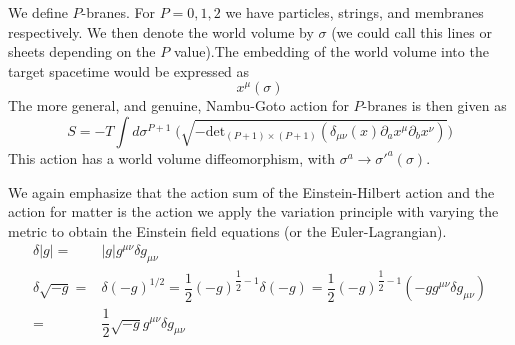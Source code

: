 \vspace{2ex}
\begin{defi}
We define $P$-branes. For $P=0,1,2$ we have particles, strings, and membranes respectively. We then denote the world volume by $\sigma $ (we could call this lines or sheets depending on the $P$ value).The embedding of the world volume into the target spacetime would be expressed as
\[x^{\mu }(\sigma )\]
The more general, and genuine, Nambu-Goto action for $P$-branes is then given as
\[S=-T\int d\sigma ^{P+1}\;\Big(\sqrt{-\mathrm{det}_{(P+1)\times (P+1)}(\delta _{\mu \nu }(x)\partial _{a}x^{\mu }\partial _{b}x^{\nu })}\Big)\]
This action has a world volume diffeomorphism, with $\sigma ^{a}\rightarrow \sigma '^{a}(\sigma )$.
\end{defi}
\vspace{2ex}
\begin{rmk}
We again emphasize that the action sum of the Einstein-Hilbert action and the action for matter is the action we apply the variation principle with varying the metric to obtain the Einstein field equations (or the Euler-Lagrangian). 
\begin{align*}
	\delta |g|=&|g|g^{\mu \nu }\delta g_{\mu \nu }\\
	\delta \sqrt{-g}=&\delta (-g)^{1/2}=\dfrac{1}{2}(-g)^{\dfrac{1}{2}-1}\delta (-g)=\dfrac{1}{2}(-g)^{\dfrac{1}{2}-1}(-gg^{\mu \nu }\delta g_{\mu \nu })\\
=&\dfrac{1}{2}\sqrt{-g}g^{\mu \nu }\delta g_{\mu \nu } 
\end{align*}
\end{rmk}
\vspace{2ex}
